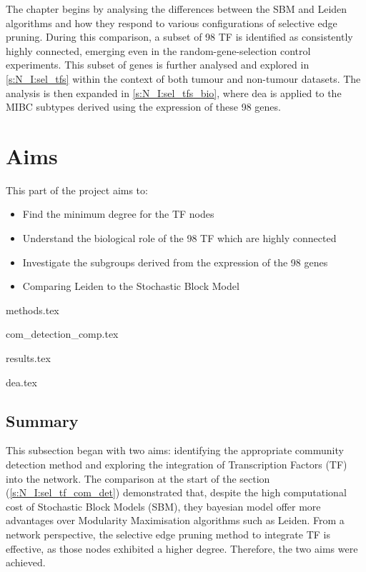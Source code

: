 The chapter begins by analysing the differences between the SBM and Leiden algorithms and how they respond to various configurations of selective edge pruning. During this comparison, a subset of 98 TF is identified as consistently highly connected, emerging even in the random-gene-selection control experiments. This subset of genes is further analysed and explored in \cref{s:N_I:sel_tfs} within the context of both tumour and non-tumour datasets. The analysis is then expanded in \cref{s:N_I:sel_tfs_bio}, where \acrfull{dea} is applied to the MIBC subtypes derived using the expression of these 98 genes.

\section{Aims}

This part of the project aims to:
\begin{itemize}
    \item Find the minimum degree for the TF nodes
    \item Understand the biological role of the 98 TF which are highly connected
    \item Investigate the subgroups derived from the expression of the 98 genes
    \item Comparing Leiden to the Stochastic Block Model
\end{itemize}


{methods.tex}

{com_detection_comp.tex}

{results.tex}

{dea.tex}


\subsection{Summary}

This subsection began with two aims: identifying the appropriate community detection method and exploring the integration of Transcription Factors (TF) into the network. The comparison at the start of the section (\ref{s:N_I:sel_tf_com_det}) demonstrated that, despite the high computational cost of Stochastic Block Models (SBM), they bayesian model offer more advantages over Modularity Maximisation algorithms such as Leiden. From a network perspective, the selective edge pruning method to integrate TF is effective, as those nodes exhibited a higher degree. Therefore, the two aims were achieved.

